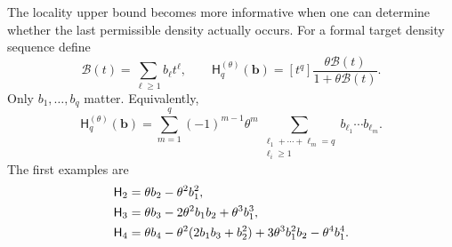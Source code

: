 \documentclass[11pt]{article}
\numberwithin{equation}{section}
\theoremstyle{definition}
\theoremstyle{remark}
\theoremstyle{definition}
\newcommand{\mgb}{\boldsymbol b}
\begin{document}
The locality upper bound becomes more informative when one can determine
whether the last permissible density actually occurs. For a formal target
density sequence define
\begin{equation}
 \mathscr B(t)=\sum_{\ell\ge1}b_\ell t^\ell,
 \qquad
 \mathsf H_q^{(\theta)}(\mgb)=
 [t^q]\frac{\theta\mathscr B(t)}{1+\theta\mathscr B(t)}.
 \label{spf:mg:eq:H}
\end{equation}
Only $b_1,\ldots,b_q$ matter. Equivalently,
\begin{equation}
 \mathsf H_q^{(\theta)}(\mgb)=
 \sum_{m=1}^q(-1)^{m-1}\theta^m
 \sum_{\substack{\ell_1+\cdots+\ell_m=q\\\ell_i\ge1}}
           b_{\ell_1}\cdots b_{\ell_m}.
 \label{spf:mg:eq:H-composition}
\end{equation}
The first examples are
\begin{align}
 \mathsf H_2&=\theta b_2-\theta^2b_1^2,\notag\\
 \mathsf H_3&=\theta b_3-2\theta^2b_1b_2+\theta^3b_1^3,\notag\\
 \mathsf H_4&=\theta b_4-\theta^2(2b_1b_3+b_2^2)
                  +3\theta^3b_1^2b_2-\theta^4b_1^4.
 \label{spf:mg:eq:H-small}
\end{align}
\end{document}
